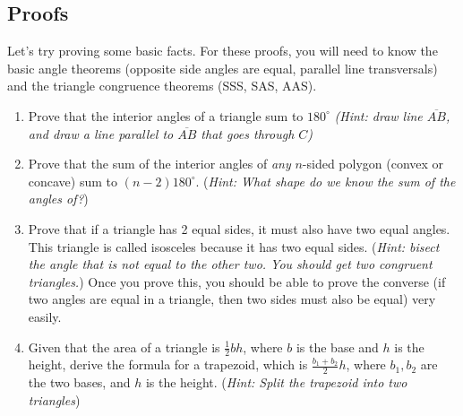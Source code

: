\subsection{Proofs}
Let's try proving some basic facts. For these proofs, you will need to know the basic angle theorems (opposite side angles are equal, parallel line transversals) and the triangle congruence theorems (SSS, SAS, AAS).
\begin{enumerate}
    \item Prove that the interior angles of a triangle sum to $180^{\circ}$ \textit{(Hint: draw line $\overline{AB}$, and draw a line parallel to $\overline{AB}$ that goes through $C$)}
    \item Prove that the sum of the interior angles of \textit{any} $n$-sided polygon (convex or concave) sum to $(n-2)180^{\circ}$. (\textit{Hint: What shape do we know the sum of the angles of?})
    \item Prove that if a triangle has 2 equal sides, it must also have two equal angles. This triangle is called isosceles because it has two equal sides. (\textit{Hint: bisect the angle that is not equal to the other two. You should get two congruent triangles.}) Once you prove this, you should be able to prove the converse (if two angles are equal in a triangle, then two sides must also be equal) very easily.
    \item Given that the area of a triangle is $\frac{1}{2} b h$, where $b$ is the base and $h$ is the height, derive the formula for a trapezoid, which is $\frac{b_1+b_2}{2}h$, where $b_1, b_2$ are the two bases, and $h$ is the height. (\textit{Hint: Split the trapezoid into two triangles})
\end{enumerate}